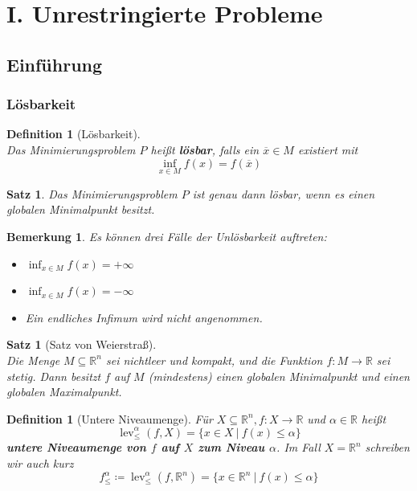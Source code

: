 \documentclass[11pt]{scrreprt}
\newcounter{thm}
\numberwithin{thm}{section}
\newtheorem{definition}[thm]{Definition}
\newtheorem{satz}[thm]{Satz}
\newtheorem*{bemerkung*}{Bemerkung}
\begin{document}
\chapter*{I. Unrestringierte Probleme}
\setcounter{chapter}{1}
\setcounter{section}{1}

\section*{Einführung}

\subsection*{Lösbarkeit}

\setcounter{section}{2}
\setcounter{thm}{2}

\begin{definition}[Lösbarkeit] ~\\
	Das Minimierungsproblem $P$ heißt \textbf{lösbar}, falls ein $\overline{x} \in M$ existiert mit
	$$ \inf_{x \in M} f(x) = f(\overline{x}) $$
\end{definition}

\setcounter{thm}{4}

\begin{satz}
	Das Minimierungsproblem $P$ ist genau dann lösbar, wenn es einen globalen Minimalpunkt besitzt.
\end{satz}

\begin{bemerkung*}
	Es können drei Fälle der Unlösbarkeit auftreten:

	\begin{itemize}
		\item $\inf_{x \in M} f(x) = + \infty$
		\item $\inf_{x \in M} f(x) = - \infty$
		\item Ein endliches Infimum wird nicht angenommen.
	\end{itemize}	
\end{bemerkung*}


\begin{satz}[Satz von Weierstraß] ~\\
	Die Menge $M \subseteq \mathbb{R}^n$ sei nichtleer und kompakt, und die Funktion $f \colon M \rightarrow \mathbb{R}$ sei stetig. Dann besitzt $f$ auf $M$ (mindestens) einen globalen Minimalpunkt und einen globalen Maximalpunkt.
\end{satz}

\setcounter{thm}{7}

\begin{definition}[Untere Niveaumenge]
	Für $X \subseteq \mathbb{R}^n, f \colon X \rightarrow \mathbb{R}$ und $\alpha \in \mathbb{R}$ heißt
	$$ \operatorname{lev}_{\leq}^{\alpha}(f, X) = \big\{ x \in X ~|~ f(x) \leq \alpha \big\} $$
	\textbf{untere Niveaumenge von $f$ auf $X$ zum Niveau $\alpha$}. Im Fall $X = \mathbb{R}^n$ schreiben wir auch kurz
	$$ f_{\leq}^{\alpha} \coloneqq \operatorname{lev}_{\leq}^{\alpha}(f, \mathbb{R}^n) = \big\{ x \in \mathbb{R}^n ~|~ f(x) \leq \alpha \big\} $$
\end{definition}
\end{document}
